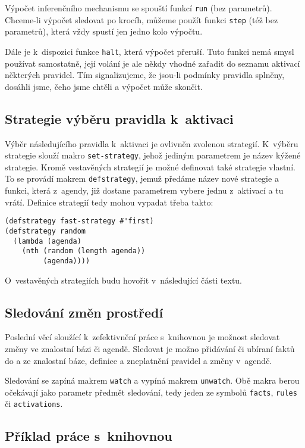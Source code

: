 Výpočet inferenčního mechanismu se spouští funkcí \verb|run| (bez parametrů).
Chceme-li výpočet sledovat po krocíh, můžeme použít funkci \verb|step| (též bez
parametrů), která vždy spustí jen jedno kolo výpočtu.

Dále je k~dispozici funkce \verb|halt|, která výpočet přeruší. Tuto funkci nemá
smysl používat samostatně, její volání je ale někdy vhodné zařadit do seznamu
aktivací některých pravidel. Tím signalizujeme, že jsou-li podmínky pravidla
splněny, dosáhli jsme, čeho jsme chtěli a výpočet může skončit.

\subsection{Strategie výběru pravidla k~aktivaci}
Výběr následujícího pravidla k~aktivaci je ovlivněn zvolenou strategií.
K~výběru strategie slouží makro \verb|set-strategy|, jehož jediným parametrem je
název kýžené strategie.
Kromě vestavěných strategií je možné definovat také strategie vlastní. To se
provádí makrem \verb|defstrategy|, jemuž předáme název nové strategie a
funkci, která z~agendy, již dostane parametrem vybere jednu z~aktivací a tu
vrátí. Definice strategií tedy mohou vypadat třeba takto:
\begin{verbatim}
(defstrategy fast-strategy #'first)
(defstrategy random
  (lambda (agenda)
    (nth (random (length agenda))
         (agenda))))
\end{verbatim}
O~vestavěných strategiích budu hovořit v~následující části textu.
\subsection{Sledování změn prostředí}
\label{watchers}
Poslední věcí sloužící k~zefektivnění práce s~knihovnou je možnost sledovat
změny ve znalostní bázi či agendě. Sledovat je možno přidávání či ubíraní faktů
do a ze znalostní báze, definice a zneplatnění pravidel a změny v~agendě.

Sledování se zapíná makrem \verb|watch| a vypíná makrem \verb|unwatch|. Obě
makra berou očekávají jako parametr předmět sledování, tedy jeden ze symbolů
\verb|facts|, \verb|rules| či \verb|activations|.
\subsection{Příklad práce s~knihovnou}

